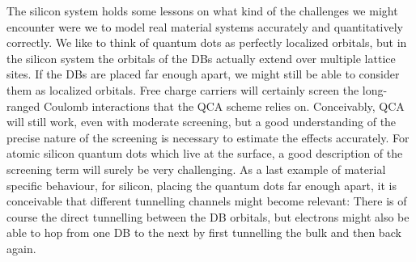The silicon system holds some lessons on what kind of the challenges we might
encounter were we to model real material systems accurately and
quantitatively correctly. We like to think of quantum dots as perfectly
localized orbitals, but in the silicon system the orbitals of the DBs actually
extend over multiple lattice sites. If the DBs are placed far enough apart, we
might still be able to consider them as localized orbitals. Free charge carriers
will certainly screen the long-ranged Coulomb interactions that the QCA scheme
relies on. Conceivably, QCA will still work, even with moderate screening, but a
good understanding of the precise nature of the screening is necessary to
estimate the effects accurately. For atomic silicon quantum dots which live at
the surface, a good description of the screening term will surely be very
challenging. As a last example of material specific behaviour, for silicon,
placing the quantum dots far enough apart, it is conceivable that different
tunnelling channels might become relevant: There is of course the direct
tunnelling between the DB orbitals, but electrons might also be able to hop from
one DB to the next by first tunnelling the bulk and then back again.

